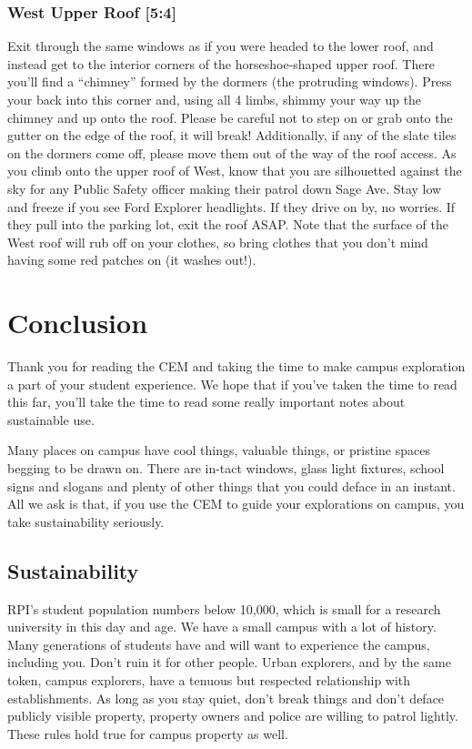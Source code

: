 \documentclass{article}
\begin{document}
\subsubsection{West Upper Roof [5:4]}
Exit through the same windows as if you were headed to the lower roof, and instead get to the interior corners of the horseshoe-shaped upper roof. There you’ll find a “chimney” formed by the dormers (the protruding windows). Press your back into this corner and, using all 4 limbs, shimmy your way up the chimney and up onto the roof. Please be careful not to step on or grab onto the gutter on the edge of the roof, it will break! Additionally, if any of the slate tiles on the dormers come off, please move them out of the way of the roof access. As you climb onto the upper roof of West, know that you are silhouetted against the sky for any Public Safety officer making their patrol down Sage Ave. Stay low and freeze if you see Ford Explorer headlights. If they drive on by, no worries. If they pull into the parking lot, exit the roof ASAP. Note that the surface of the West roof will rub off on your clothes, so bring clothes that you don’t mind having some red patches on (it washes out!).

\section{Conclusion}

Thank you for reading the CEM and taking the time to make campus exploration a part of your student experience. We hope that if you’ve taken the time to read this far, you’ll take the time to read some really important notes about sustainable use.

Many places on campus have cool things, valuable things, or pristine spaces begging to be drawn on. There are in-tact windows, glass light fixtures, school signs and slogans and plenty of other things that you could deface in an instant. All we ask is that, if you use the CEM to guide your explorations on campus, you take sustainability seriously.
\subsection{Sustainability}

RPI’s student population numbers below 10,000, which is small for a research university in this day and age. We have a small campus with a lot of history. Many generations of students have and will want to experience the campus, including you. Don’t ruin it for other people. Urban explorers, and by the same token, campus explorers, have a tenuous but respected relationship with establishments. As long as you stay quiet, don’t break things and don’t deface publicly visible property, property owners and police are willing to patrol lightly. These rules hold true for campus property as well. 
\end{document}
